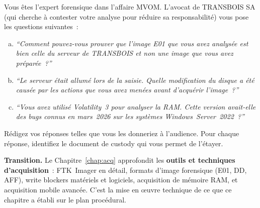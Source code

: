 \begin{boxexo}[title={\ding{45}\quad Exercice~8.3. Défense en contre-interrogatoire \niveauexpert}]
Vous êtes l'expert forensique dans l'affaire MVOM. L'avocat de TRANSBOIS SA
(qui cherche à contester votre analyse pour réduire sa responsabilité)
vous pose les questions suivantes~:
\begin{enumerate}[(a)]
    \item \textit{``Comment pouvez-vous prouver que l'image E01 que vous avez
          analysée est bien celle du serveur de TRANSBOIS et non une image
          que vous avez préparée~?''}
    \item \textit{``Le serveur était allumé lors de la saisie. Quelle
          modification du disque a été causée par les actions que vous avez
          menées avant d'acquérir l'image~?''}
    \item \textit{``Vous avez utilisé Volatility~3 pour analyser la RAM.
          Cette version avait-elle des bugs connus en mars~2026 sur les
          systèmes Windows~Server~2022~?''}
\end{enumerate}
Rédigez vos réponses telles que vous les donneriez à l'audience.
Pour chaque réponse, identifiez le document de custody qui vous permet
de l'étayer.
\end{boxexo}

\bigskip

\begin{boxinfo}
\textbf{Transition.} Le Chapitre~\ref{chap:acq} approfondit les
\textbf{outils et techniques d'acquisition}~: FTK~Imager en détail,
formats d'image forensique (E01, DD, AFF), write blockers matériels et
logiciels, acquisition de mémoire RAM, et acquisition mobile avancée.
C'est la mise en \oe uvre technique de ce que ce chapitre a établi
sur le plan procédural.
\end{boxinfo}
